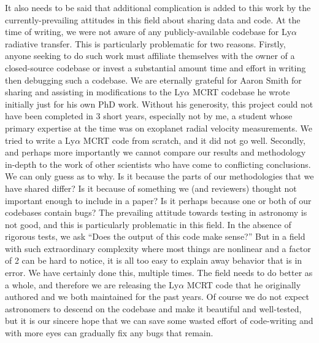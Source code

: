 It also needs to be said that additional complication is added to this work by the currently-prevailing attitudes in this field about sharing data and code.
At the time of writing, we were not aware of any publicly-available codebase for Ly$\alpha$ radiative transfer.
This is particularly problematic for two reasons.
Firstly, anyone seeking to do such work must affiliate themselves with the owner of a closed-source codebase or invest a substantial amount time and effort in writing then debugging such a codebase.
We are eternally grateful for Aaron Smith for sharing and assisting in modifications to the Ly$\alpha$ MCRT codebase he wrote initially just for his own PhD work.
Without his generosity, this project could not have been completed in 3 short years, especially not by me, a student whose primary expertise at the time was on exoplanet radial velocity measurements.
We tried to write a Ly$\alpha$ MCRT code from scratch, and it did not go well.
Secondly, and perhaps more importantly we cannot compare our results and methodology in-depth to the work of other scientists who have come to conflicting conclusions.
We can only guess as to why.
Is it because the parts of our methodologies that we have shared differ?
Is it because of something we (and reviewers) thought not important enough to include in a paper?
Is it perhaps because one or both of our codebases contain bugs?
The prevailing attitude towards testing in astronomy is not good, and this is particularly problematic in this field.
In the absence of rigorous tests, we ask ``Does the output of this code make sense?''
But in a field with such extraordinary complexity where most things are nonlinear and a factor of 2 can be hard to notice, it is all too easy to explain away behavior that is in error.
We have certainly done this, multiple times.
The field needs to do better as a whole, and therefore we are releasing the Ly$\alpha$ MCRT code that he originally authored and we both maintained for the past years.
Of course we do not expect astronomers to descend on the codebase and make it beautiful and well-tested, but it is our sincere hope that we can save some wasted effort of code-writing and with more eyes can gradually fix any bugs that remain.

